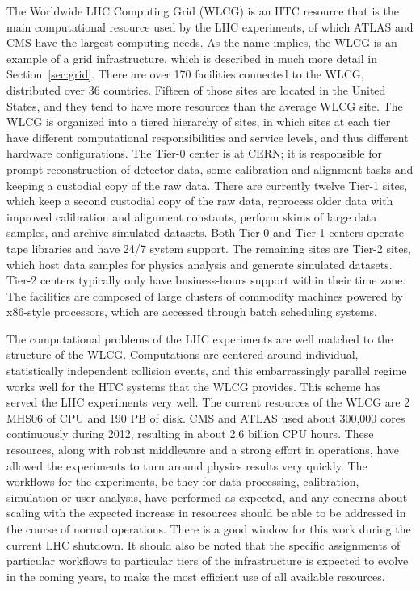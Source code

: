 The Worldwide LHC Computing Grid (WLCG) is an HTC resource that is the main computational resource used by the LHC experiments, of which ATLAS and CMS have the largest computing needs.  As the name implies, the WLCG is an example of a grid infrastructure, which is described in much more detail in Section~\ref{sec:grid}.  There are over 170 facilities connected to the WLCG, distributed over 36 countries.  Fifteen of those sites are located in the United States, and they tend to have more resources than the average WLCG site.  The WLCG is organized into a tiered hierarchy of sites, in which sites at each tier have different computational responsibilities and service levels, and thus different hardware configurations.  The Tier-0 center is at CERN; it is responsible for prompt reconstruction of detector data, some calibration and alignment tasks and keeping a custodial copy of the raw data.  There are currently twelve Tier-1 sites, which keep a second custodial copy of the raw data, reprocess older data with improved calibration and alignment constants, perform skims of large data samples, and archive simulated datasets.  Both Tier-0 and Tier-1 centers operate tape libraries and have 24/7 system support.  The remaining sites are Tier-2 sites, which host data samples for physics analysis and generate simulated datasets.  Tier-2 centers typically only have business-hours support within their time zone.  The facilities are composed of large clusters of commodity machines powered by x86-style processors, which are accessed through batch scheduling systems.

The computational problems of the LHC experiments are well matched to the structure of the WLCG.  Computations are centered around individual, statistically independent collision events, and this embarrassingly parallel regime works well for the HTC systems that the WLCG provides.  This scheme has served the LHC experiments very well.  The current resources of the WLCG are 2 MHS06 of CPU and 190 PB of disk.  CMS and ATLAS used about 300,000 cores continuously during 2012, resulting in about 2.6 billion CPU hours.  These resources, along with robust middleware and a strong effort in operations, have allowed the experiments to turn around physics results very quickly.  The workflows for the experiments, be they for data processing, calibration, simulation or user analysis, have performed as expected, and any concerns about scaling with the expected increase in resources should be able to be addressed in the course of normal operations.  There is a good window for this work during the current LHC shutdown.  It should also be noted that the specific assignments of particular workflows to particular tiers of the infrastructure is expected to evolve in the coming years, to make the most efficient use of all available resources.

